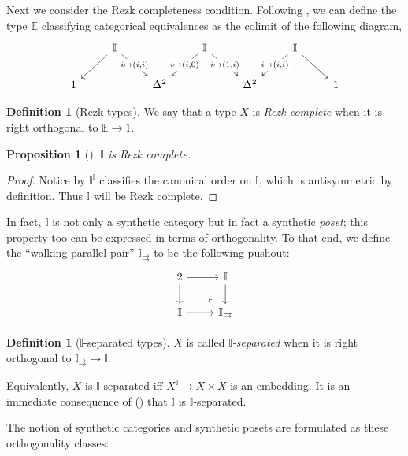 \documentclass[a4paper,12pt]{amsart}
\newtheorem{proposition}[theorem]{Proposition}
\theoremstyle{definition}
\newtheorem{definition}[theorem]{Definition}
\newcommand{\mbb}[1]{\mathbb{#1}}
\newcommand{\I}{\mbb I}
\begin{document}
Next we consider the Rezk completeness condition. Following \citet{buchholtz2021synthetic}, we can define the type $\mbb E$ classifying categorical equivalences as the colimit of the following diagram,
\[
\begin{tikzcd}
	& \I && \I && \I \\
	1 && {\Delta^2} && {\Delta^2} && 1
	\arrow[from=1-2, to=2-1]
	\arrow["{i \mapsto (i,i)}"{description}, from=1-2, to=2-3]
	\arrow["{i \mapsto (i,0)}"{description}, from=1-4, to=2-3]
	\arrow["{i \mapsto (1,i)}"{description}, from=1-4, to=2-5]
	\arrow["{i \mapsto (i,i)}"{description}, from=1-6, to=2-5]
	\arrow[from=1-6, to=2-7]
\end{tikzcd}
\]


\begin{definition}[Rezk types]
  We say that a type $X$ is \emph{Rezk complete} when it is right orthogonal to $\mbb E \to 1$.
\end{definition}

\begin{proposition}[\AxiomSQCP]
  $\I$ is Rezk complete.
\end{proposition}
\begin{proof}
  Notice by  $\I^\I$ classifies the canonical order on $\I$, which is antisymmetric by definition. Thus $\I$ will be Rezk complete.
\end{proof}

In fact, $\I$ is not only a synthetic category but in fact a synthetic \emph{poset}; this property too can be expressed in terms of orthogonality. To that end, we define the ``walking parallel pair'' $\I_{\rightrightarrows}$ to be the following pushout:
\[
\begin{tikzcd}
  2 \ar[r] \ar[d] & \I \ar[d] \\ 
  \I \ar[r] & \I_{\rightrightarrows}
  \arrow["\lrcorner"{anchor=center, pos=0.125, rotate=180}, draw=none, from=2-2, to=1-1]
\end{tikzcd}
\]

\begin{definition}[$\I$-separated types]
  $X$ is called \emph{$\I$-separated} when it is right orthogonal to $\I_{\rightrightarrows} \to \I$.
\end{definition}

Equivalently, $X$ is $\I$-separated iff $X^\I \to X \times X$ is an embedding. It is an immediate consequence of (\AxiomSQCP) that $\I$ is $\I$-separated.

The notion of synthetic categories and synthetic posets are formulated as these orthogonality classes:
\end{document}
